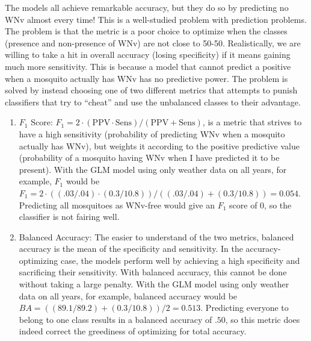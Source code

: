 \documentclass[12pt]{article}
\begin{document}
The models all achieve remarkable accuracy, but they do so by predicting no WNv almost every time! This is a well-studied problem with prediction problems. The problem is that the metric is a poor choice to optimize when the classes (presence and non-presence of WNv) are not close to 50-50. Realistically, we are willing to take a hit in overall accuracy (losing specificity) if it means gaining much more sensitivity. This is because a model that cannot predict a positive when a mosquito actually has WNv has no predictive power. The problem is solved by instead choosing one of two different metrics that attempts to punish classifiers that try to ``cheat'' and use the unbalanced classes to their advantage.

\begin{enumerate}
\item $F_1$ Score\cite{powers2011evaluation}: $F_1 = 2 \cdot \left( \mathrm{PPV} \cdot \mathrm{Sens} \right) / \left( \mathrm{PPV} + \mathrm{Sens}\right)$, is a metric that strives to have a high sensitivity (probability of predicting WNv when a mosquito actually has WNv), but weights it according to the positive predictive value (probability of a mosquito having WNv when I have predicted it to be present). With the GLM model using only weather data on all years, for example, $F_1$ would be $F_1 = 2 \cdot ( (.03/.04) \cdot (0.3 / 10.8)) / ( (.03/.04) + (0.3 / 10.8)) = 0.054$. Predicting all mosquitoes as WNv-free would give an $F_1$ score of $0$, so the classifier is not fairing well.

\item Balanced Accuracy\cite{brodersen2010balanced}: The easier to understand of the two metrics, balanced accuracy is the mean of the specificity and sensitivity. In the accuracy-optimizing case, the models perform well by achieving a high specificity and sacrificing their sensitivity. With balanced accuracy, this cannot be done without taking a large penalty. With the GLM model using only weather data on all years, for example, balanced accuracy would be $BA = ((89.1/89.2) + (0.3 / 10.8)) / 2 = 0.513$. Predicting everyone to belong to one class results in a balanced accuracy of $.50$, so this metric does indeed correct the greediness of optimizing for total accuracy.
\end{enumerate}
\end{document}
